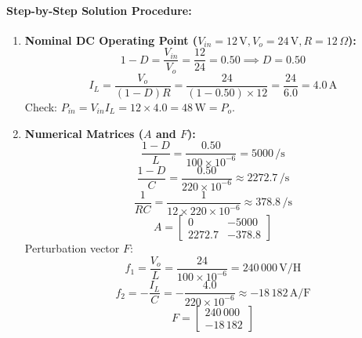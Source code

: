 \paragraph{Step-by-Step Solution Procedure:}
\begin{enumerate}
  \item \textbf{Nominal DC Operating Point ($V_{in} = 12\,\si{\volt}, V_o = 24\,\si{\volt}, R = 12\,\Omega$):}
  \begin{equation}
  1 - D = \frac{V_{in}}{V_o} = \frac{12}{24} = 0.50 \implies D = 0.50
  \end{equation}
  \begin{equation}
  I_L = \frac{V_o}{(1-D)R} = \frac{24}{(1 - 0.50) \times 12} = \frac{24}{6.0} = 4.0\,\si{\ampere}
  \end{equation}
  Check: $P_{in} = V_{in} I_L = 12 \times 4.0 = 48\,\si{\watt} = P_o$.

  \item \textbf{Numerical Matrices ($A$ and $F$):}
  \begin{equation}
  \frac{1-D}{L} = \frac{0.50}{100 \times 10^{-6}} = 5000\,\si{\per\second}
  \end{equation}
  \begin{equation}
  \frac{1-D}{C} = \frac{0.50}{220 \times 10^{-6}} \approx 2272.7\,\si{\per\second}
  \end{equation}
  \begin{equation}
  \frac{1}{R C} = \frac{1}{12 \times 220 \times 10^{-6}} \approx 378.8\,\si{\per\second}
  \end{equation}
  \begin{equation}
  A = \begin{bmatrix} 0 & -5000 \\ 2272.7 & -378.8 \end{bmatrix}
  \end{equation}
  Perturbation vector $F$:
  \begin{equation}
  f_1 = \frac{V_o}{L} = \frac{24}{100 \times 10^{-6}} = 240\,000\,\si{\volt\per\henry}
  \end{equation}
  \begin{equation}
  f_2 = -\frac{I_L}{C} = -\frac{4.0}{220 \times 10^{-6}} \approx -18\,182\,\si{\ampere\per\farad}
  \end{equation}
  \begin{equation}
  F = \begin{bmatrix} 240\,000 \\ -18\,182 \end{bmatrix}
  \end{equation}


\end{enumerate}
